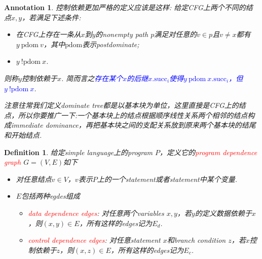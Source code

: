 \documentclass{article}
\newtheorem{definition}[theorem]{Definition}
\newtheorem{annotation}[theorem]{Annotation}
\newcommand{\redt}[1]{\textcolor{red}{#1}}
\newcommand{\bluet}[1]{\textcolor{blue}{#1}}
\begin{document}
\begin{annotation}\label{the-def-of-control-dependence}
\rm 控制依赖更加严格的定义应该是这样: 给定CFG上两个不同的结点$x,y$，若满足下述条件\cite{cdg}: 
\begin{itemize}
	\item 在CFG上存在一条从$x$到$y$的nonempty path $p$满足对任意的$v \in p$且$v \neq x$都有$y~\text{pdom}~v$，其中$\text{pdom}$表示postdominate;  
	\item $y~\text{!pdom}~x$. 
\end{itemize}
则称$y$控制依赖于$x$. 简而言之\bluet{存在某个$x$的后继$x.{\text{succ}_i}$使得$y~\text{pdom}~x.{\text{succ}_i}$，但$y~\text{!pdom}~x$}. 

注意往常我们定义dominate tree都是以基本块为单位，这里直接是CFG上的结点，所以你要推广一下:一个基本块上的结点根据顺序线性关系两个相邻的结点构成immediate dominance，再把基本块之间的支配关系放到原来两个基本块的结尾和开始结点.   
\end{annotation}



\begin{definition}
\rm 给定simple language上的program $P$，定义它的\redt{program dependence graph} $G = (V,E)$如下
\begin{itemize}
	\item 对任意结点$v \in V$，$v$表示$P$上的一个statement或者statement中某个变量. 
	\item $E$包括两种egdes组成
		\begin{itemize}
			\item \redt{data dependence edges}: 对任意两个variables $x,y$，若$y$的定义数据依赖于$x$，则$(x,y) \in E$，所有这样的edges记为$E_d$. 
			\item \redt{control dependence edges}: 对任意statement $x$和branch condition $z$，若$x$控制依赖于$z$，则$(x,z) \in E$，所有这样的edges记为$E_c$. 		
		\end{itemize}		 
\end{itemize}
\end{definition}
\end{document}
